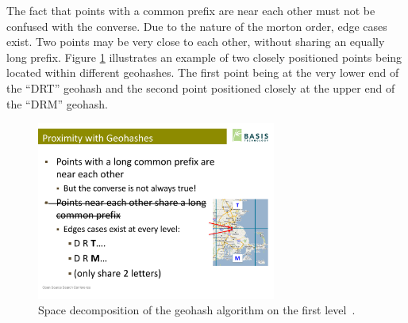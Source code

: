 The fact that points with a common prefix are near each other must not be confused with the converse. Due to the nature of the morton order, edge cases exist. Two points may be very close to each other, without sharing an equally long prefix. Figure \ref{fig:geohash-edge} illustrates an example of two closely positioned points being located within different geohashes. The first point being at the very lower end of the ``DRT'' geohash and the second point positioned closely at the upper end of the ``DRM'' geohash. 

\begin{figure}[h]
  \begin{center}
    \includegraphics[width=0.7\textwidth]{figures/geohash_edges.pdf}
    \caption{Space decomposition of the geohash algorithm on the first level~\cite{Smiley11geohash}.}
    \label{fig:geohash-edge}
  \end{center}
\end{figure}



























